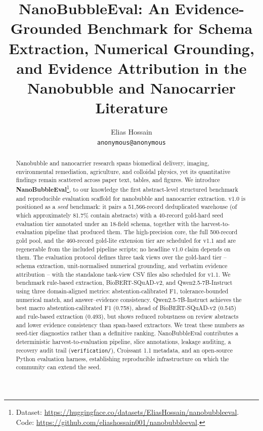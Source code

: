 \documentclass{article}
\title{NanoBubbleEval: An Evidence-Grounded Benchmark for Schema Extraction,
Numerical Grounding, and Evidence Attribution in the Nanobubble and
Nanocarrier Literature}
\author{
Elias Hossain \\
\texttt{anonymous@anonymous}
}
\begin{document}
\maketitle

\begin{abstract}
Nanobubble and nanocarrier research spans biomedical delivery, imaging, environmental remediation, agriculture, and colloidal physics, yet its quantitative findings remain scattered across paper text, tables, and figures. We introduce \textbf{NanoBubbleEval}\footnote{Dataset: \url{https://huggingface.co/datasets/EliasHossain/nanobubbleeval}. Code: \url{https://github.com/eliashossain001/nanobubbleeval}.}, to our knowledge the first abstract-level structured benchmark and reproducible evaluation scaffold for nanobubble and nanocarrier extraction. v1.0 is positioned as a \emph{seed} benchmark: it pairs a 51{,}566-record deduplicated warehouse (of which approximately 81.7\% contain abstracts) with a 40-record gold-hard seed evaluation tier annotated under an 18-field schema, together with the harvest-to-evaluation pipeline that produced them. The high-precision core, the full 500-record gold pool, and the 460-record gold-lite extension tier are scheduled for v1.1 and are regenerable from the included pipeline scripts; no headline v1.0 claim depends on them. The evaluation protocol defines three task views over the gold-hard tier -- schema extraction, unit-normalised numerical grounding, and verbatim evidence attribution -- with the standalone task-view CSV files also scheduled for v1.1. We benchmark rule-based extraction, BioBERT-SQuAD-v2, and Qwen2.5-7B-Instruct using three domain-aligned metrics: abstention-calibrated F1, tolerance-bounded numerical match, and answer--evidence consistency. Qwen2.5-7B-Instruct achieves the best macro abstention-calibrated F1 (0.758), ahead of BioBERT-SQuAD-v2 (0.545) and rule-based extraction (0.493), but shows reduced robustness on review abstracts and lower evidence consistency than span-based extractors. We treat these numbers as seed-tier diagnostics rather than a definitive ranking. NanoBubbleEval contributes a deterministic harvest-to-evaluation pipeline, slice annotations, leakage auditing, a recovery audit trail (\texttt{verification/}), Croissant 1.1 metadata, and an open-source Python evaluation harness, establishing reproducible infrastructure on which the community can extend the seed.
\end{abstract}
\end{document}
